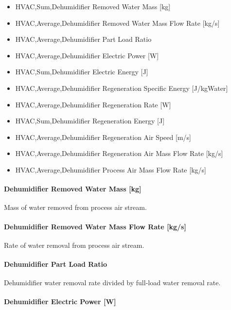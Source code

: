 \begin{itemize}
\item
  HVAC,Sum,Dehumidifier Removed Water Mass {[}kg{]}
\item
  HVAC,Average,Dehumidifier Removed Water Mass Flow Rate {[}kg/s{]}
\item
  HVAC,Average,Dehumidifier Part Load Ratio \protect\hyperlink{section-1}{}
\item
  HVAC,Average,Dehumidifier Electric Power {[}W{]}
\item
  HVAC,Sum,Dehumidifier Electric Energy {[}J{]}
\item
  HVAC,Average,Dehumidifier Regeneration Specific Energy {[}J/kgWater{]}
\item
  HVAC,Average,Dehumidifier Regeneration Rate {[}W{]}
\item
  HVAC,Sum,Dehumidifier Regeneration Energy {[}J{]}
\item
  HVAC,Average,Dehumidifier Regeneration Air Speed {[}m/s{]}
\item
  HVAC,Average,Dehumidifier Regeneration Air Mass Flow Rate {[}kg/s{]}
\item
  HVAC,Average,Dehumidifier Process Air Mass Flow Rate {[}kg/s{]}
\end{itemize}

\paragraph{Dehumidifier Removed Water Mass {[}kg{]}}\label{dehumidifier-removed-water-mass-kg}

Mass of water removed from process air stream.

\paragraph{Dehumidifier Removed Water Mass Flow Rate {[}kg/s{]}}\label{dehumidifier-removed-water-mass-flow-rate-kgs}

Rate of water removal from process air stream.

\paragraph{\texorpdfstring{Dehumidifier Part Load Ratio \protect\hyperlink{section-1}{}}{Dehumidifier Part Load Ratio }}\label{dehumidifier-part-load-ratio}

Dehumidifier water removal rate divided by full-load water removal rate.

\paragraph{Dehumidifier Electric Power {[}W{]}}\label{dehumidifier-electric-power-w}

